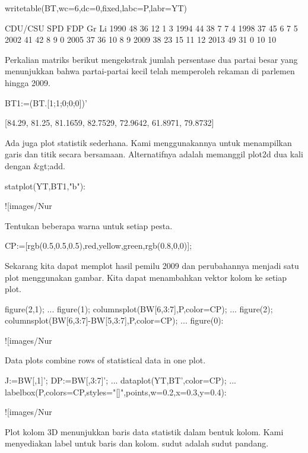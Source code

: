 \documentclass{article}
\begin{document}
\>writetable(BT,wc=6,dc=0,\>fixed,labc=P,labr=YT)


           CDU/CSU   SPD   FDP    Gr    Li
      1990      48    36    12     1     3
      1994      44    38     7     7     4
      1998      37    45     6     7     5
      2002      41    42     8     9     0
      2005      37    36    10     8     9
      2009      38    23    15    11    12
      2013      49    31     0    10    10

Perkalian matriks berikut mengekstrak jumlah persentase dua partai
besar yang menunjukkan bahwa partai-partai kecil telah memperoleh
rekaman di parlemen hingga 2009.


\>BT1:=(BT.[1;1;0;0;0])'


    [84.29,  81.25,  81.1659,  82.7529,  72.9642,  61.8971,  79.8732]

Ada juga plot statistik sederhana. Kami menggunakannya untuk
menampilkan garis dan titik secara bersamaan. Alternatifnya adalah
memanggil plot2d dua kali dengan &gt;add.


\>statplot(YT,BT1,"b"):


![images/Nur%

Tentukan beberapa warna untuk setiap pesta.


\>CP:=[rgb(0.5,0.5,0.5),red,yellow,green,rgb(0.8,0,0)];


Sekarang kita dapat memplot hasil pemilu 2009 dan perubahannya menjadi
satu plot menggunakan gambar. Kita dapat menambahkan vektor kolom ke
setiap plot.


\>figure(2,1);  ...  
\>   figure(1); columnsplot(BW[6,3:7],P,color=CP); ...  
\>   figure(2); columnsplot(BW[6,3:7]-BW[5,3:7],P,color=CP);  ...  
\>   figure(0):


![images/Nur%

Data plots combine rows of statistical data in one plot.


\>J:=BW[,1]'; DP:=BW[,3:7]'; ...  
\>   dataplot(YT,BT',color=CP);  ...  
\>   labelbox(P,colors=CP,styles="[]",\>points,w=0.2,x=0.3,y=0.4):


![images/Nur%

Plot kolom 3D menunjukkan baris data statistik dalam bentuk kolom.
Kami menyediakan label untuk baris dan kolom. sudut adalah sudut
pandang.
\end{document}
